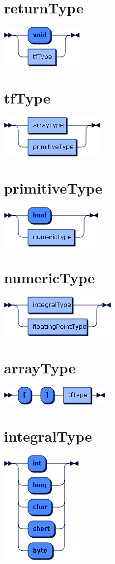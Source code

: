 \begin{appendices}
\section*{returnType}\includegraphics[scale=0.7]{img/ebnf_grammar/returnType}
\section*{tfType}\includegraphics[scale=0.7]{img/ebnf_grammar/tfType}
\section*{primitiveType}\includegraphics[scale=0.7]{img/ebnf_grammar/primitiveType}
\section*{numericType}\includegraphics[scale=0.7]{img/ebnf_grammar/numericType}
\section*{arrayType}\includegraphics[scale=0.7]{img/ebnf_grammar/arrayType}
\section*{integralType}\includegraphics[scale=0.7]{img/ebnf_grammar/integralType}

\end{appendices}
